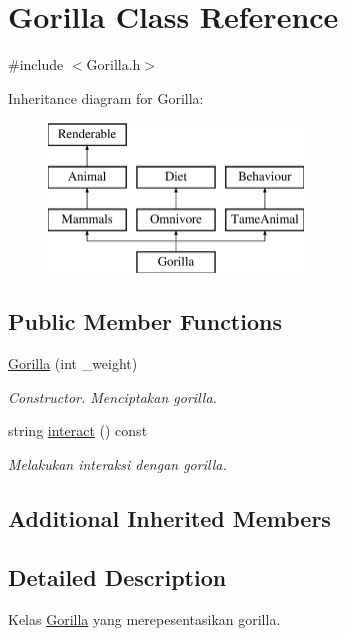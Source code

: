 \hypertarget{classGorilla}{\section{Gorilla Class Reference}
\label{classGorilla}
}


{\ttfamily \#include $<$Gorilla.\+h$>$}

Inheritance diagram for Gorilla\+:\begin{figure}[H]
\begin{center}
\leavevmode
\includegraphics[height=4.000000cm]{classGorilla}
\end{center}
\end{figure}
\subsection*{Public Member Functions}
\begin{DoxyCompactItemize}
\item 
\hypertarget{classGorilla_a242f07524eed46be55f48e9779ad9ec5}{\hyperlink{classGorilla_a242f07524eed46be55f48e9779ad9ec5}{Gorilla} (int \+\_\+weight)}\label{classGorilla_a242f07524eed46be55f48e9779ad9ec5}

\begin{DoxyCompactList}\small\item\em Constructor. Menciptakan gorilla. \end{DoxyCompactList}\item 
string \hyperlink{classGorilla_acb6db934144c2616f5cac01045eb0535}{interact} () const 
\begin{DoxyCompactList}\small\item\em Melakukan interaksi dengan gorilla. \end{DoxyCompactList}\end{DoxyCompactItemize}
\subsection*{Additional Inherited Members}


\subsection{Detailed Description}
Kelas \hyperlink{classGorilla}{Gorilla} yang merepesentasikan gorilla. 

